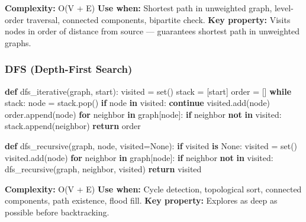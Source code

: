 \documentclass[11pt]{article}
\newenvironment{Shaded}{\begin{snugshade}}{\end{snugshade}}
\newcommand{\BuiltInTok}[1]{\textcolor[rgb]{0.50,0.55,0.55}{#1}}
\newcommand{\ControlFlowTok}[1]{\textcolor[rgb]{0.99,0.74,0.29}{\textbf{#1}}}
\newcommand{\KeywordTok}[1]{\textcolor[rgb]{0.81,0.81,0.76}{\textbf{#1}}}
\newcommand{\NormalTok}[1]{\textcolor[rgb]{0.81,0.81,0.76}{#1}}
\newcommand{\OperatorTok}[1]{\textcolor[rgb]{0.81,0.81,0.76}{#1}}
\newcommand{\VariableTok}[1]{\textcolor[rgb]{0.15,0.68,0.68}{#1}}
\begin{document}
\textbf{Complexity:} O(V + E)
\textbf{Use when:} Shortest path in unweighted graph, level-order traversal, connected components, bipartite check.
\textbf{Key property:} Visits nodes in order of distance from source --- guarantees shortest path in unweighted graphs.

\subsubsection{DFS (Depth-First Search)}\label{dfs-depth-first-search}


\begin{Shaded}
\begin{Highlighting}[]
\KeywordTok{def}\NormalTok{ dfs\_iterative(graph, start):}
\NormalTok{    visited }\OperatorTok{=} \BuiltInTok{set}\NormalTok{()}
\NormalTok{    stack }\OperatorTok{=}\NormalTok{ [start]}
\NormalTok{    order }\OperatorTok{=}\NormalTok{ []}
    \ControlFlowTok{while}\NormalTok{ stack:}
\NormalTok{        node }\OperatorTok{=}\NormalTok{ stack.pop()}
        \ControlFlowTok{if}\NormalTok{ node }\KeywordTok{in}\NormalTok{ visited:}
            \ControlFlowTok{continue}
\NormalTok{        visited.add(node)}
\NormalTok{        order.append(node)}
        \ControlFlowTok{for}\NormalTok{ neighbor }\KeywordTok{in}\NormalTok{ graph[node]:}
            \ControlFlowTok{if}\NormalTok{ neighbor }\KeywordTok{not} \KeywordTok{in}\NormalTok{ visited:}
\NormalTok{                stack.append(neighbor)}
    \ControlFlowTok{return}\NormalTok{ order}

\KeywordTok{def}\NormalTok{ dfs\_recursive(graph, node, visited}\OperatorTok{=}\VariableTok{None}\NormalTok{):}
    \ControlFlowTok{if}\NormalTok{ visited }\KeywordTok{is} \VariableTok{None}\NormalTok{: visited }\OperatorTok{=} \BuiltInTok{set}\NormalTok{()}
\NormalTok{    visited.add(node)}
    \ControlFlowTok{for}\NormalTok{ neighbor }\KeywordTok{in}\NormalTok{ graph[node]:}
        \ControlFlowTok{if}\NormalTok{ neighbor }\KeywordTok{not} \KeywordTok{in}\NormalTok{ visited:}
\NormalTok{            dfs\_recursive(graph, neighbor, visited)}
    \ControlFlowTok{return}\NormalTok{ visited}
\end{Highlighting}
\end{Shaded}

\textbf{Complexity:} O(V + E)
\textbf{Use when:} Cycle detection, topological sort, connected components, path existence, flood fill.
\textbf{Key property:} Explores as deep as possible before backtracking.
\end{document}
